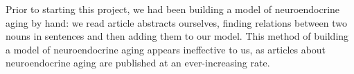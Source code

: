 Prior to starting this project, we had been building a model of neuroendocrine aging by hand: we read article abstracts
ourselves, finding relations between two nouns in sentences and then adding them to our model. This
method of building a model of neuroendocrine aging appears ineffective to us, as articles about neuroendocrine
aging are published at an ever-increasing rate.

